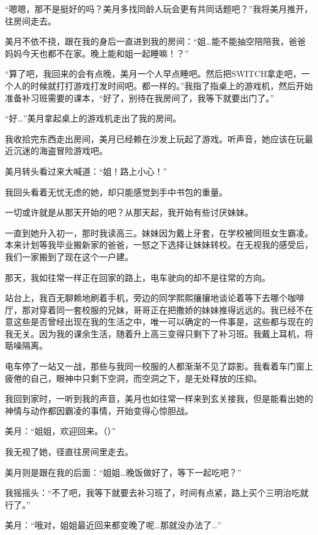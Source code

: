 “嗯嗯，那不是挺好的吗？美月多找同龄人玩会更有共同话题吧？”我将美月推开，往房间走去。

美月不依不挠，跟在我的身后一直进到我的房间：“姐…能不能抽空陪陪我，爸爸妈妈今天也都不在家。晚上能和姐一起睡嘛！？”

“算了吧，我回来的会有点晚，美月一个人早点睡吧。然后把SWITCH拿走吧，一个人的时候就打打游戏打发时间吧。都一样的。”我指了指桌上的游戏机，然后开始准备补习班需要的课本，“好了，别待在我房间了，我等下就要出门了。”

“好…”美月拿起桌上的游戏机走出了我的房间。

我收拾完东西走出房间，美月已经赖在沙发上玩起了游戏。听声音，她应该在玩最近沉迷的海盗冒险游戏吧。

美月转头看过来大喊道：“姐！路上小心！”

我回头看着无忧无虑的她，却只能感觉到手中书包的重量。

一切或许就是从那天开始的吧？从那天起，我开始有些讨厌妹妹。

\cutlinesm

一直到她升入初一，那时我读高三。妹妹因为戴上牙套，在学校被同班女生霸凌。本来计划等我毕业搬新家的爸爸，一怒之下选择让妹妹转校。在无视我的感受后，我们一家搬到了现在这个一户建。

那天，我如往常一样正在回家的路上，电车驶向的却不是往常的方向。

站台上，我百无聊赖地刷着手机，旁边的同学熙熙攘攘地谈论着等下去哪个咖啡厅，那对穿着同一套校服的兄妹，哥哥正在把撒娇的妹妹推得远远的。我已经不在意这些是否曾经出现在我的生活之中，唯一可以确定的一件事是，这些都与现在的我无关。因为我的课余生活，随着升上高三变得只剩下了补习班。我戴上耳机，将聒噪隔离。

电车停了一站又一战，那些与我同一校服的人都渐渐不见了踪影。我看着车门窗上疲倦的自己，眼神中只剩下空洞，而空洞之下，是无处释放的压抑。

我回到家时，一听到我的声音，美月也如往常一样来到玄关接我，但是能看出她的神情与动作都因霸凌的事情，开始变得心惊胆战。

美月：“姐姐，欢迎回来。（）”

我无视了她，径直往房间里走去。

美月则是跟在我的后面：“姐姐…晚饭做好了，等下一起吃吧？”

我摇摇头：“不了吧，我等下就要去补习班了，时间有点紧，路上买个三明治吃就行了。”

\newday{\hate\cmoon}

美月：“哦对，姐姐最近回来都变晚了呢…那就没办法了…”


